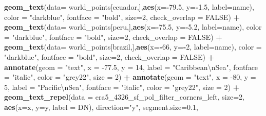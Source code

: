 \documentclass[12pt,oneside]{reedthesis}
\newenvironment{Shaded}{\begin{snugshade}}{\end{snugshade}}
\newcommand{\CharTok}[1]{\textcolor[rgb]{0.31,0.60,0.02}{#1}}
\newcommand{\DataTypeTok}[1]{\textcolor[rgb]{0.13,0.29,0.53}{#1}}
\newcommand{\DecValTok}[1]{\textcolor[rgb]{0.00,0.00,0.81}{#1}}
\newcommand{\FloatTok}[1]{\textcolor[rgb]{0.00,0.00,0.81}{#1}}
\newcommand{\KeywordTok}[1]{\textcolor[rgb]{0.13,0.29,0.53}{\textbf{#1}}}
\newcommand{\NormalTok}[1]{#1}
\newcommand{\OperatorTok}[1]{\textcolor[rgb]{0.81,0.36,0.00}{\textbf{#1}}}
\newcommand{\OtherTok}[1]{\textcolor[rgb]{0.56,0.35,0.01}{#1}}
\newcommand{\StringTok}[1]{\textcolor[rgb]{0.31,0.60,0.02}{#1}}
\begin{document}
\begin{Shaded}
\begin{Highlighting}[]
\StringTok{  }\KeywordTok{geom_text}\NormalTok{(}\DataTypeTok{data=}\NormalTok{ world_points[ecuador,],}\KeywordTok{aes}\NormalTok{(}\DataTypeTok{x=}\OperatorTok{-}\FloatTok{79.5}\NormalTok{, }\DataTypeTok{y=}\OperatorTok{-}\FloatTok{1.5}\NormalTok{, }\DataTypeTok{label=}\NormalTok{name), }\DataTypeTok{color =} \StringTok{"darkblue"}\NormalTok{, }\DataTypeTok{fontface =} \StringTok{"bold"}\NormalTok{, }\DataTypeTok{size=}\DecValTok{2}\NormalTok{, }\DataTypeTok{check_overlap =} \OtherTok{FALSE}\NormalTok{) }\OperatorTok{+}
\StringTok{  }\KeywordTok{geom_text}\NormalTok{(}\DataTypeTok{data=}\NormalTok{ world_points[peru,],}\KeywordTok{aes}\NormalTok{(}\DataTypeTok{x=}\OperatorTok{-}\FloatTok{75.5}\NormalTok{, }\DataTypeTok{y=}\OperatorTok{-}\FloatTok{5.2}\NormalTok{, }\DataTypeTok{label=}\NormalTok{name), }\DataTypeTok{color =} \StringTok{"darkblue"}\NormalTok{, }\DataTypeTok{fontface =} \StringTok{"bold"}\NormalTok{, }\DataTypeTok{size=}\DecValTok{2}\NormalTok{, }\DataTypeTok{check_overlap =} \OtherTok{FALSE}\NormalTok{) }\OperatorTok{+}
\StringTok{  }\KeywordTok{geom_text}\NormalTok{(}\DataTypeTok{data=}\NormalTok{ world_points[brazil,],}\KeywordTok{aes}\NormalTok{(}\DataTypeTok{x=}\OperatorTok{-}\DecValTok{66}\NormalTok{, }\DataTypeTok{y=}\OperatorTok{-}\DecValTok{2}\NormalTok{, }\DataTypeTok{label=}\NormalTok{name), }\DataTypeTok{color =} \StringTok{"darkblue"}\NormalTok{, }\DataTypeTok{fontface =} \StringTok{"bold"}\NormalTok{, }\DataTypeTok{size=}\DecValTok{2}\NormalTok{, }\DataTypeTok{check_overlap =} \OtherTok{FALSE}\NormalTok{) }\OperatorTok{+}
\StringTok{  }\KeywordTok{annotate}\NormalTok{(}\DataTypeTok{geom =} \StringTok{"text"}\NormalTok{, }\DataTypeTok{x =} \FloatTok{-77.5}\NormalTok{, }\DataTypeTok{y =} \DecValTok{14}\NormalTok{, }\DataTypeTok{label =} \StringTok{"Caribbean}\CharTok{\textbackslash{}n}\StringTok{Sea"}\NormalTok{, }\DataTypeTok{fontface =} \StringTok{"italic"}\NormalTok{, }\DataTypeTok{color =} \StringTok{"grey22"}\NormalTok{, }\DataTypeTok{size =} \DecValTok{2}\NormalTok{) }\OperatorTok{+}\StringTok{ }
\StringTok{  }\KeywordTok{annotate}\NormalTok{(}\DataTypeTok{geom =} \StringTok{"text"}\NormalTok{, }\DataTypeTok{x =} \DecValTok{-80}\NormalTok{, }\DataTypeTok{y =} \DecValTok{5}\NormalTok{, }\DataTypeTok{label =} \StringTok{"Pacific}\CharTok{\textbackslash{}n}\StringTok{Sea"}\NormalTok{, }\DataTypeTok{fontface =} \StringTok{"italic"}\NormalTok{, }\DataTypeTok{color =} \StringTok{"grey22"}\NormalTok{, }\DataTypeTok{size =} \DecValTok{2}\NormalTok{) }\OperatorTok{+}
\StringTok{  }\KeywordTok{geom_text_repel}\NormalTok{(}\DataTypeTok{data =}\NormalTok{ era5_}\DecValTok{4326}\NormalTok{_sf_pol_filter_corners_left, }\DataTypeTok{size=}\DecValTok{2}\NormalTok{, }\KeywordTok{aes}\NormalTok{(}\DataTypeTok{x=}\NormalTok{x, }\DataTypeTok{y=}\NormalTok{y, }\DataTypeTok{label =}\NormalTok{ DN), }\DataTypeTok{direction=}\StringTok{"y"}\NormalTok{, }\DataTypeTok{segment.size=}\FloatTok{0.1}\NormalTok{, }

\end{Highlighting}
\end{Shaded}
\end{document}
